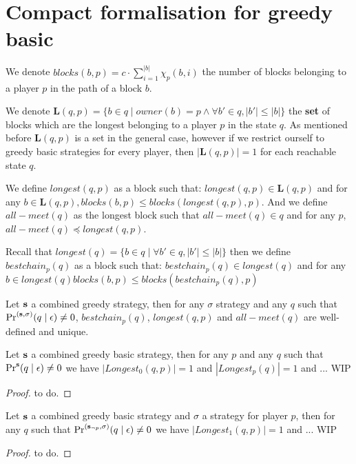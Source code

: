 \documentclass[11pt]{article}
\begin{document}
\section{Compact formalisation for greedy basic}


We denote
$
blocks(b,p)  =
{\displaystyle c \cdot \sum_{i=1}^{|b|} \chi_p(b,i)}
$ the number of blocks belonging to a player $p$ in the path of a block $b$.

We denote
$\mathbf{L}(q,p) = \{b \in q \mid owner(b) = p \land \forall b' \in q, |b'| \leq |b|  \}$ the \textbf{set} of blocks which are the longest belonging to a player $p$ in the state $q$.
As mentioned before $\mathbf{L}(q,p)$ is a set in the general case, however if we restrict ourself to greedy basic strategies for every player, then $|\mathbf{L}(q,p)| = 1$ for each reachable state $q$.

We define $longest(q,p)$ as a block such that: $longest(q,p) \in \mathbf{L}(q,p)$ and for any $b \in \mathbf{L}(q,p), blocks(b,p) \leq blocks(longest(q,p),p)$. And we define $all-meet(q)$ as the longest block such that $all-meet(q) \in q$ and for any $p$, $all-meet(q) \preceq longest(q,p)$.

Recall that $longest(q) = \{b\in q \mid \forall b' \in q, |b'| \leq |b| \}$ then we define
$bestchain_p(q)$ as a block such that: $bestchain_p(q) \in  longest(q)$ and for any $ b \in longest(q) blocks(b,p) \leq blocks(bestchain_p(q),p)$

\begin{myprop}
Let $\mathbf{s}$ a combined greedy strategy, then for any $\sigma$ strategy and any $q$ such that $\Pr^{(\mathbf{s},\sigma)}(q \mid \epsilon) \neq 0$, $bestchain_p(q)$, $longest(q,p)$ and $all-meet(q)$ are well-defined and unique.
\end{myprop}



\iffalse
\begin{myprop}
Let $\mathbf{s}$ a combined greedy basic strategy, then for any $p$ and any $q$  such that $\Pr^{\mathbf{s}}(q \mid \epsilon) \neq 0$ we have $|Longest_0(q,p)| = 1$ and $|Longest_p(q)| = 1$ and ... WIP
\end{myprop}
\begin{proof}
to do.
\end{proof}

\begin{myprop}
Let $\mathbf{s}$ a combined greedy basic strategy and $\sigma$ a strategy for player $p$, then for any $q$ such that $\Pr^{(\mathbf{s}_{\lnot p},\sigma)}(q \mid \epsilon) \neq 0$ we have $|Longest_1(q,p)| = 1$ and ... WIP
\end{myprop}
\begin{proof}
to do.
\end{proof}
\end{document}
